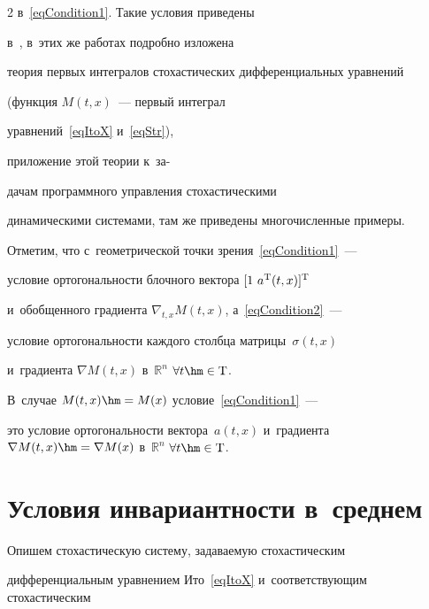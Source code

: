 \begin{multicols}{2}
в~\eqref{eqCondition1}. Такие условия приведены 

в~\cite{Dub_89, Dub_12, Kar_14, Kar_15}, в~этих же работах подробно изложена 

тео\-рия первых интегралов стохастических дифференциальных уравнений 

(функция $M(t,x)$~--- первый интеграл

уравнений~\eqref{eqItoX} и~\eqref{eqStr}), 

приложение этой тео\-рии к~за-\linebreak\vspace*{-12pt}



\columnbreak



\noindent

 дачам программного управления стохастическими 

динамическими сис\-те\-ма\-ми, там же приведены многочисленные примеры.



Отметим, что с~геометрической точки зрения~\eqref{eqCondition1}~--- 

условие ортогональности блочного вектора $[  1 \  a^{{\mathrm{T}}}(t,x)]^{{\mathrm{T}}}$ 

и~обобщенного градиента $\nabla_{t,x} M(t,x)$, а~\eqref{eqCondition2}~--- 

условие ортогональности каж\-до\-го столбца матрицы~$\sigma(t,x)$ 

и~градиента $\nabla M(t,x)$ в~$\mathds{R}^n$ $\forall t \hm\in \mathrm{T}$. 

В~случае $M(t,x) \hm= M(x)$ условие~\eqref{eqCondition1}~--- 

это условие ортогональности вектора~$a(t,x)$ и~градиента $\nabla M(t,x) 

\hm= \nabla M(x)$ в~$\mathds{R}^n$ $\forall t \hm\in \mathrm{T}$.



\vspace*{-4pt}



\section{Условия инвариантности в~среднем}



Опишем стохастическую систему, задаваемую стохастическим 

дифференциальным уравнением Ито~\eqref{eqItoX} и~соответствующим стохастическим 


\end{multicols}
